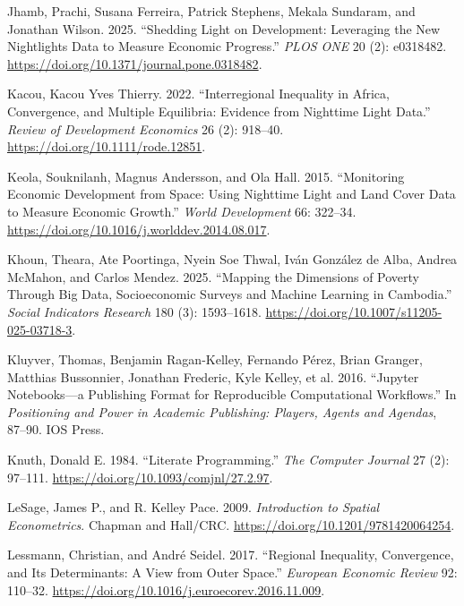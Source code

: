 \documentclass[
  letterpaper,
  DIV=11,
  numbers=noendperiod]{scrartcl}
\newlength{\cslhangindent}
\newenvironment{CSLReferences}[2] %
 {\begin{list}{}{%
  \setlength{\itemindent}{0pt}
  \setlength{\leftmargin}{0pt}
  \setlength{\parsep}{0pt}
  \ifodd #1
   \setlength{\leftmargin}{\cslhangindent}
   \setlength{\itemindent}{-1\cslhangindent}
  \fi
  \setlength{\itemsep}{#2\baselineskip}}}
 {\end{list}}
\begin{document}
\begin{CSLReferences}{1}{0}
Jhamb, Prachi, Susana Ferreira, Patrick Stephens, Mekala Sundaram, and
Jonathan Wilson. 2025. {``Shedding Light on Development: Leveraging the
New Nightlights Data to Measure Economic Progress.''} \emph{PLOS ONE} 20
(2): e0318482. \url{https://doi.org/10.1371/journal.pone.0318482}.

Kacou, Kacou Yves Thierry. 2022. {``Interregional Inequality in
{Africa}, Convergence, and Multiple Equilibria: Evidence from Nighttime
Light Data.''} \emph{Review of Development Economics} 26 (2): 918--40.
\url{https://doi.org/10.1111/rode.12851}.

Keola, Souknilanh, Magnus Andersson, and Ola Hall. 2015. {``Monitoring
Economic Development from Space: Using Nighttime Light and Land Cover
Data to Measure Economic Growth.''} \emph{World Development} 66:
322--34. \url{https://doi.org/10.1016/j.worlddev.2014.08.017}.

Khoun, Theara, Ate Poortinga, Nyein Soe Thwal, Iván González de Alba,
Andrea McMahon, and Carlos Mendez. 2025. {``Mapping the Dimensions of
Poverty Through Big Data, Socioeconomic Surveys and Machine Learning in
{Cambodia}.''} \emph{Social Indicators Research} 180 (3): 1593--1618.
\url{https://doi.org/10.1007/s11205-025-03718-3}.

Kluyver, Thomas, Benjamin Ragan-Kelley, Fernando Pérez, Brian Granger,
Matthias Bussonnier, Jonathan Frederic, Kyle Kelley, et al. 2016.
{``Jupyter Notebooks---a Publishing Format for Reproducible
Computational Workflows.''} In \emph{Positioning and Power in Academic
Publishing: Players, Agents and Agendas}, 87--90. IOS Press.

Knuth, Donald E. 1984. {``Literate Programming.''} \emph{The Computer
Journal} 27 (2): 97--111. \url{https://doi.org/10.1093/comjnl/27.2.97}.

LeSage, James P., and R. Kelley Pace. 2009. \emph{Introduction to
Spatial Econometrics}. {Chapman and Hall/CRC}.
\url{https://doi.org/10.1201/9781420064254}.

Lessmann, Christian, and André Seidel. 2017. {``Regional Inequality,
Convergence, and Its Determinants: A View from Outer Space.''}
\emph{European Economic Review} 92: 110--32.
\url{https://doi.org/10.1016/j.euroecorev.2016.11.009}.


\end{CSLReferences}
\end{document}
